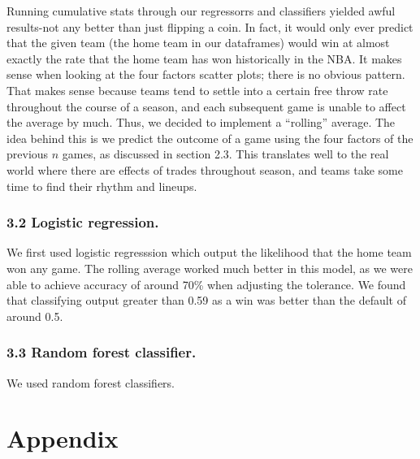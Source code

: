\documentclass[11pt]{article}
\begin{document}
Running cumulative stats through our regressorrs and classifiers yielded
awful results-not any better than just flipping a coin. In fact, it
would only ever predict that the given team (the home team in our
dataframes) would win at almost exactly the rate that the home team has
won historically in the NBA. It makes sense when looking at the four
factors scatter plots; there is no obvious pattern. That makes sense
because teams tend to settle into a certain free throw rate throughout
the course of a season, and each subsequent game is unable to affect the
average by much. Thus, we decided to implement a ``rolling'' average.
The idea behind this is we predict the outcome of a game using the four
factors of the previous \(n\) games, as discussed in section 2.3. This
translates well to the real world where there are effects of trades
throughout season, and teams take some time to find their rhythm and
lineups.

\subsubsection{3.2 Logistic regression.}\label{logistic-regression.}

We first used logistic regresssion which output the likelihood that the
home team won any game. The rolling average worked much better in this
model, as we were able to achieve accuracy of around 70\% when adjusting
the tolerance. We found that classifying output greater than 0.59 as a
win was better than the default of around 0.5.

\subsubsection{3.3 Random forest
classifier.}\label{random-forest-classifier.}

We used random forest classifiers.

    \section{Appendix}\label{appendix}
\end{document}
